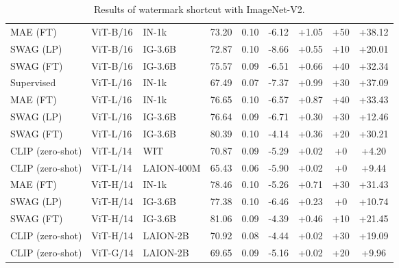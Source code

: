 \documentclass[10pt,twocolumn,letterpaper]{article}
\begin{document}
\begin{table*}[h]
\begin{adjustbox}{width=\linewidth}
\begin{tabular}{@{}lll|cc|cc|cc@{}}
MAE (FT)         & ViT-B/16     & IN-1k      & 73.20     & 0.10      & -6.12         & +1.05              & +50        & +38.12                      \\
SWAG (LP)        & ViT-B/16     & IG-3.6B    & 72.87     & 0.10      & -8.66         & +0.55              & +10        & +20.01                      \\
SWAG (FT)        & ViT-B/16     & IG-3.6B    & 75.57     & 0.09      & -6.51         & +0.66              & +40        & +32.34                      \\ \midrule
Supervised       & ViT-L/16     & IN-1k      & 67.49     & 0.07      & -7.37         & +0.99              & +30        & +37.09                      \\
MAE (FT)         & ViT-L/16     & IN-1k      & 76.65     & 0.10      & -6.57         & +0.87              & +40        & +33.43                      \\
SWAG (LP)        & ViT-L/16     & IG-3.6B    & 76.64     & 0.09      & -6.71         & +0.30              & +30        & +12.46                      \\
SWAG (FT)        & ViT-L/16     & IG-3.6B    & 80.39     & 0.10      & -4.14         & +0.36              & +20        & +30.21                      \\
CLIP (zero-shot) & ViT-L/14     & WIT     & 70.87     & 0.09      & -5.29         & +0.02              & +0         & +4.20                       \\
CLIP (zero-shot) & ViT-L/14     & LAION-400M & 65.43     & 0.06      & -5.90         & +0.02              & +0         & +9.44                       \\ \midrule
MAE (FT)         & ViT-H/14     & IN-1k      & 78.46     & 0.10      & -5.26         & +0.71              & +30        & +31.43                      \\
SWAG (LP)        & ViT-H/14     & IG-3.6B    & 77.38     & 0.10      & -6.46         & +0.23              & +0         & +10.74                      \\
SWAG (FT)        & ViT-H/14     & IG-3.6B    & 81.06     & 0.09      & -4.39         & +0.46              & +10        & +21.45                      \\
CLIP (zero-shot) & ViT-H/14     & LAION-2B   & 70.92     & 0.08      & -4.44         & +0.02              & +30        & +19.09                      \\ \midrule
CLIP (zero-shot) & ViT-G/14     & LAION-2B   & 69.65     & 0.09      & -5.16         & +0.02              & +20        & +9.96                       \\ \bottomrule
\end{tabular}
\end{adjustbox}
\caption{Results of watermark shortcut with ImageNet-V2.}
\label{tab:in_v2_watermark}
\end{table*}
\end{document}
